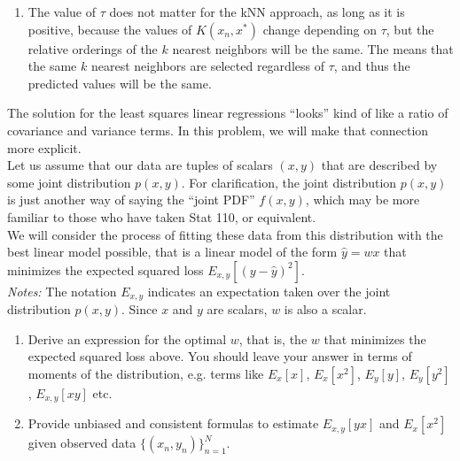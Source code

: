 \documentclass[submit]{harvardml}
\begin{document}
\begin{enumerate}
	\item The value of $\tau$ does not matter for the kNN approach, as long as it is positive, because the values of $K(x_n, x^*)$ change depending on $\tau$, but the relative orderings of the $k$ nearest neighbors will be the same. The means that the same $k$ nearest neighbors are selected regardless of $\tau$, and thus the predicted values will be the same.
	
\end{enumerate}

\newpage 


\begin{problem}

  The solution for the least squares linear regressions ``looks'' kind
  of like a ratio of covariance and variance terms.  In this problem,
  we will make that connection more explicit. \\

  \noindent Let us assume that our data are tuples of scalars $(x,y)$ that are
  described by some joint distribution $p(x,y)$.  For clarification, the joint distribution $p(x,y)$ is just another way of saying the ``joint PDF'' $f(x,y)$, which may be more familiar to those who have taken Stat 110, or equivalent. \\
  
  \noindent We will consider the process of fitting these data from this distribution with the best linear model
  possible, that is a linear model of the form $\hat{y} = wx$ that
  minimizes the expected squared loss $E_{x,y}[ ( y - \hat{y} )^2
  ]$.\\

\noindent \emph{Notes:} The notation $E_{x, y}$ indicates an
expectation taken over the joint distribution $p(x,y)$.  Since $x$ and
$y$ are scalars, $w$ is also a scalar.
  
  \begin{enumerate}

  \item Derive an expression for the optimal $w$, that is, the $w$
    that minimizes the expected squared loss above.  You should leave
    your answer in terms of moments of the distribution, e.g. terms
    like $E_x[x]$, $E_x[x^2]$, $E_y[y]$, $E_y[y^2]$, $E_{x,y}[xy]$
    etc.

\item Provide unbiased and consistent formulas to estimate $E_{x, y}[yx]$
 and $E_x[x^2]$ given observed data $\{(x_n,y_n)\}_{n=1}^N$.


\end{enumerate}
\end{problem}
\end{document}
